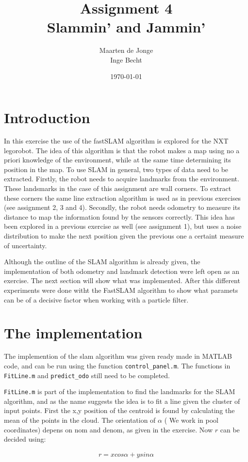 \documentclass[a4paper, 12pt]{article}
\author{Maarten de Jonge \\
    Inge Becht}
\date{\today}
\title{Assignment 4\\ 
Slammin' and Jammin'}
\begin{document}
\maketitle
\section{Introduction}
In this exercise the use of the fastSLAM algorithm is explored for the NXT
legorobot. The idea of this algorithm is that the robot makes a map using no a
priori knowledge of the environment,
while at the same time determining its position in the map.
To use SLAM in general, two types of data need to be extracted. Firstly,
the robot needs to acquire landmarks from the
environment. These landsmarks in the case of this assignment are wall corners. To extract these
corners the same line extraction algorithm is used as in previous exercises (see assignment 2, 3 and 4). 
Secondly, the robot needs odometry to measure its distance to map the information found by the
sensors correctly. This idea has been explored in a
previous exercise as well (see assignment 1), but uses a noise distribution to
make the next position given the previous one a certaint measure of uncertainty.

Although the outline of the SLAM algorithm is already given, the implementation
of both odometry and landmark detection were left open as an exercise. The next
section will show what was implemented. After this different experiments were
done witht the FastSLAM
algorithm to show what paramets can be of a decisive factor when working with a
particle filter.


\section{The implementation}
The implemention of the slam algorithm was given ready made in MATLAB code, and
can be run using the function \texttt{control\_panel.m}. The functions in
\texttt{FitLine.m} and \texttt{predict\_odo} still need to be completed.

\texttt{FitLine.m} is part of the implementation to find the landmarks for the
SLAM algorithm, and as the name suggests the idea is to fit a line given the
cluster of input points. First the x,y position of the centroid is found by
calculating the mean of the points in the cloud. The orientation of $\alpha$ (
We work in pool coordinates) depens on nom and denom, as given in the exercise.
Now $r$ can be decided using:

\begin{align*}
    r = x cos \alpha + y sin \alpha
\end{align*}
\end{document}
